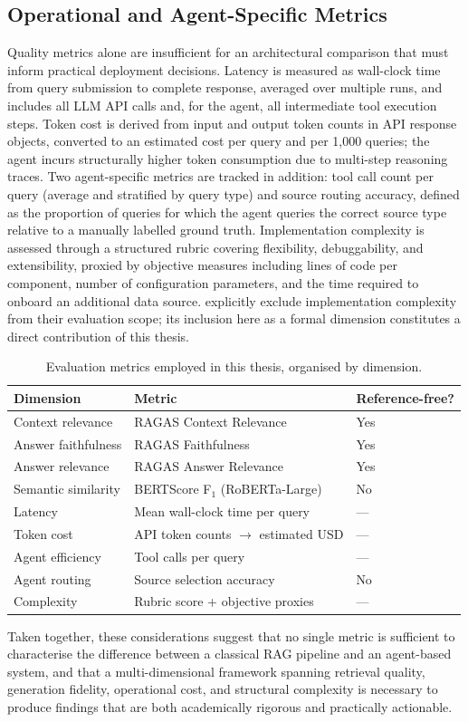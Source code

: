 \subsection*{Operational and Agent-Specific Metrics}

Quality metrics alone are insufficient for an architectural comparison that must inform practical deployment decisions. Latency is measured as wall-clock time from query submission to complete response, averaged over multiple runs, and includes all LLM API calls and, for the agent, all intermediate tool execution steps. Token cost is derived from input and output token counts in API response objects, converted to an estimated cost per query and per 1,000 queries; the agent incurs structurally higher token consumption due to multi-step reasoning traces. Two agent-specific metrics are tracked in addition: tool call count per query (average and stratified by query type) and source routing accuracy, defined as the proportion of queries for which the agent queries the correct source type relative to a manually labelled ground truth. Implementation complexity is assessed through a structured rubric covering flexibility, debuggability, and extensibility, proxied by objective measures including lines of code per component, number of configuration parameters, and the time required to onboard an additional data source.  explicitly exclude implementation complexity from their evaluation scope; its inclusion here as a formal dimension constitutes a direct contribution of this thesis.

\begin{table}[ht]
\centering
\caption{Evaluation metrics employed in this thesis, organised by dimension.}
\label{tab:metrics}
\begin{tabular}{lll}
\hline
\textbf{Dimension} & \textbf{Metric} & \textbf{Reference-free?} \\
\hline
Context relevance & RAGAS Context Relevance & Yes \\
Answer faithfulness & RAGAS Faithfulness & Yes \\
Answer relevance & RAGAS Answer Relevance & Yes \\
Semantic similarity & BERTScore F$_1$ (RoBERTa-Large) & No \\
Latency & Mean wall-clock time per query & --- \\
Token cost & API token counts $\rightarrow$ estimated USD & --- \\
Agent efficiency & Tool calls per query & --- \\
Agent routing & Source selection accuracy & No \\
Complexity & Rubric score + objective proxies & --- \\
\hline
\end{tabular}
\end{table}

Taken together, these considerations suggest that no single metric is sufficient to characterise the difference between a classical RAG pipeline and an agent-based system, and that a multi-dimensional framework spanning retrieval quality, generation fidelity, operational cost, and structural complexity is necessary to produce findings that are both academically rigorous and practically actionable.
